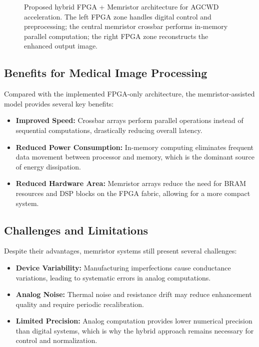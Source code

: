 \documentclass[conference]{IEEEtran}
\begin{document}
\begin{figure}[!t]
\begin{tikzpicture}[node distance=0.5cm and 2.5cm, scale=0.85, every node/.style={transform shape}]
\end{tikzpicture}
\caption{Proposed hybrid FPGA + Memristor architecture for AGCWD acceleration. The left FPGA zone handles digital control and preprocessing; the central memristor crossbar performs in-memory parallel computation; the right FPGA zone reconstructs the enhanced output image.}
\label{fig:architecture}
\end{figure}

\subsection{Benefits for Medical Image Processing}

Compared with the implemented FPGA-only architecture, the memristor-assisted model provides several key benefits:
\begin{itemize}
    \item \textbf{Improved Speed:} Crossbar arrays perform parallel operations instead of sequential computations, drastically reducing overall latency.
    \item \textbf{Reduced Power Consumption:} In-memory computing eliminates frequent data movement between processor and memory, which is the dominant source of energy dissipation.
    \item \textbf{Reduced Hardware Area:} Memristor arrays reduce the need for BRAM resources and DSP blocks on the FPGA fabric, allowing for a more compact system.
\end{itemize}

\subsection{Challenges and Limitations}

Despite their advantages, memristor systems still present several challenges:
\begin{itemize}
    \item \textbf{Device Variability:} Manufacturing imperfections cause conductance variations, leading to systematic errors in analog computations.
    \item \textbf{Analog Noise:} Thermal noise and resistance drift may reduce enhancement quality and require periodic recalibration.
    \item \textbf{Limited Precision:} Analog computation provides lower numerical precision than digital systems, which is why the hybrid approach remains necessary for control and normalization.
\end{itemize}
\end{document}
